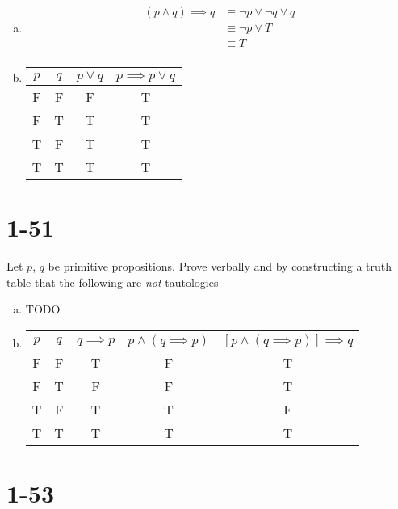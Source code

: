 \documentclass{article}
\begin{document}
\begin{enumerate}[a)]
    \item
        \begin{align*}
            (p \land q) \implies q
            &\equiv \neg p \lor \neg q \lor q \\
            &\equiv \neg p \lor T \\
            &\equiv T \\
        \end{align*}
    \item
        \begin{tabular}{ |c|c|c|c| }
            \hline
                $p$ & $q$ & $p \lor q$ & $p \implies p \lor q$ \\
            \hline
                F & F & F & T \\
                F & T & T & T \\
                T & F & T & T \\
                T & T & T & T \\
            \hline
        \end{tabular}
\end{enumerate}

\section{1-51}

Let $p$, $q$ be primitive propositions.  Prove verbally and by
constructing a truth table that the following are \textit{not}
tautologies

\begin{enumerate}[a)]
    \item TODO
    \item 
        \begin{tabular}{ |c|c|c|c|c| }
            \hline
                $p$ & $q$ & $q \implies p$ & $p \land (q \implies p)$ & $[p \land (q \implies p)] \implies q$ \\
            \hline
                F & F & T & F & T \\
                F & T & F & F & T \\
                T & F & T & T & F \\
                T & T & T & T & T \\
            \hline
        \end{tabular}
\end{enumerate}

\section{1-53}
\end{document}
